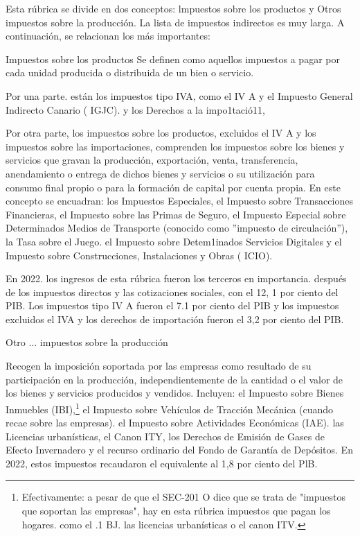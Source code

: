 \documentclass[10pt,a4paper]{article}
\begin{document}
Esta rúbrica se divide en dos conceptos: lmpuestos sobre los productos y Otros impuestos sobre la producción. La lista de impuestos indirectos es muy larga. A continuación, se relacionan los más importantes: 

Impuestos sobre los productos
Se definen como aquellos impuestos a pagar por cada unidad producida o distribuida de un bien o servicio.

Por una parte. están los impuestos tipo IVA, como el IV A y el Impuesto General Indirecto Canario ( IGJC). y los Derechos a la impo1tació11,

Por otra parte, los impuestos sobre los productos, excluidos el IV A y los impuestos sobre las importaciones, comprenden los impuestos sobre los bienes y servicios que gravan la producción, exportación, venta, transferencia, anendamiento o entrega de dichos bienes y servicios o su utilización para consumo final propio o para la formación de capital por cuenta propia. En este concepto se encuadran: los Impuestos Especiales, el Impuesto sobre Transacciones Financieras, el Impuesto sobre las Primas de Seguro, el Impuesto Especial sobre Determinados Medios de Transporte (conocido como ''impuesto de circulación''), la Tasa sobre el Juego. el Impuesto sobre Detem1inados Servicios Digitales y el Impuesto sobre Construcciones, Instalaciones y Obras ( ICIO).

En 2022. los ingresos de esta rúbrica fueron los terceros en importancia. después de los impuestos directos y las cotizaciones sociales, con el 12, 1 por ciento del PIB. Los impuestos tipo IV A fueron el 7.1 por ciento del PIB y los impuestos excluidos el IVA y los derechos de importación fueron el 3,2 por ciento del PIB.

Otro ... impuestos sobre la producción

Recogen la imposición soportada por las empresas como resultado de su participación en la producción, independientemente de la cantidad o el valor de los bienes y servicios producidos y vendidos. Incluyen: el Impuesto sobre Bienes Inmuebles (IBI),\footnote{%
    Efectivamente: a pesar de que el SEC-201 O dice que se trata de "impuestos que soportan las empresas", hay en esta rúbrica impuestos que pagan los hogares. como el .1 BJ. las licencias urbanísticas o el canon ITV.
} el Impuesto sobre Vehículos de Tracción Mecánica (cuando recae sobre las empresas). el Impuesto sobre Actividades Económicas (IAE). las Licencias urbanísticas, el Canon ITY, los Derechos de Emisión de Gases de Efecto Invernadero y el recurso ordinario del Fondo de Garantía de Depósitos. En 2022, estos impuestos recaudaron el equivalente al 1,8 por ciento del PlB.
\end{document}
